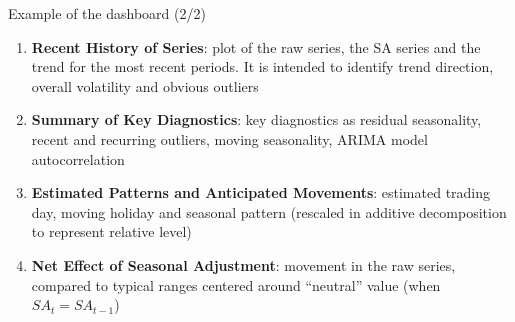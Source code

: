 \documentclass[10pt,xcolor=table,color={dvipsnames,usenames},ignorenonframetext,usepdftitle=false,french]{beamer}
\begin{document}
\begin{frame}{Example of the dashboard (2/2)}

\begin{enumerate}
\def\labelenumi{\arabic{enumi}.}
\item
  \textbf{Recent History of Series}: plot of the raw series, the SA
  series and the trend for the most recent periods. It is intended to
  identify trend direction, overall volatility and obvious outliers
\item
  \textbf{Summary of Key Diagnostics}: key diagnostics as residual
  seasonality, recent and recurring outliers, moving seasonality, ARIMA
  model autocorrelation
\item
  \textbf{Estimated Patterns and Anticipated Movements}: estimated
  trading day, moving holiday and seasonal pattern (rescaled in additive
  decomposition to represent relative level)
\item
  \textbf{Net Effect of Seasonal Adjustment}: movement in the raw
  series, compared to typical ranges centered around ``neutral'' value
  (when \(SA_t = SA_{t-1}\))
\end{enumerate}

\end{frame}
\end{document}
